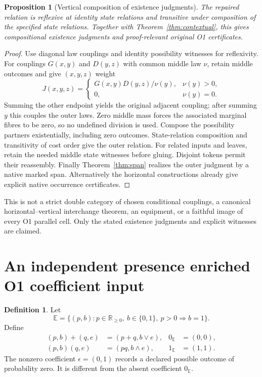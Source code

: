 \documentclass[11pt,a4paper]{article}
\newtheorem{proposition}[theorem]{Proposition}
\theoremstyle{definition}
\newtheorem{definition}[theorem]{Definition}
\newcommand{\E}{\mathbb E}
\begin{document}
\begin{proposition}[Vertical composition of existence judgments]
\label{prop:vertical}
The repaired relation is reflexive at identity state relations and
transitive under composition of the specified state relations. Together
with Theorem~\ref{thm:contextual}, this gives compositional existence
judgments and proof-relevant original O1 certificates.
\end{proposition}
\begin{proof}
Use diagonal law couplings and identity possibility witnesses for
reflexivity. For couplings $G(x,y)$ and $D(y,z)$ with common middle law
$\nu$, retain middle outcomes and give $(x,y,z)$ weight
\[
 J(x,y,z)=
 \begin{cases}G(x,y)D(y,z)/\nu(y),&\nu(y)>0,\\0,&\nu(y)=0.\end{cases}
\]
Summing the other endpoint yields the original adjacent coupling; after
summing $y$ this couples the outer laws. Zero middle mass forces the
associated marginal fibres to be zero, so no undefined division is used.
Compose the possibility partners existentially, including zero outcomes.
State-relation composition and transitivity of cost order give the outer
relation. For related inputs and leaves, retain the needed middle state
witnesses before gluing. Disjoint tokens permit their reassembly. Finally
Theorem~\ref{thm:span} realizes the outer judgment by a native marked
span. Alternatively the horizontal constructions already give explicit
native occurrence certificates.
\end{proof}
This is not a strict double category of chosen conditional couplings,
a canonical horizontal--vertical interchange theorem, an equipment, or
a faithful image of every O1 parallel cell. Only the stated existence
judgments and explicit witnesses are claimed.

\section{An independent presence enriched O1 coefficient input}
\label{sec:rig}
\begin{definition}
Let
\[
 \E=\{(p,b):p\in\mathbb R_{\geq0},\ b\in\{0,1\},\ p>0\Rightarrow b=1\}.
\]
Define
\begin{align*}
 (p,b)+(q,e)&=(p+q,b\lor e),&0_{\E}&=(0,0),\\
 (p,b)(q,e)&=(pq,b\land e),&1_{\E}&=(1,1).
\end{align*}
The nonzero coefficient $\epsilon=(0,1)$ records a declared possible
outcome of probability zero. It is different from the absent coefficient
$0_{\E}$.
\end{definition}
\end{document}
